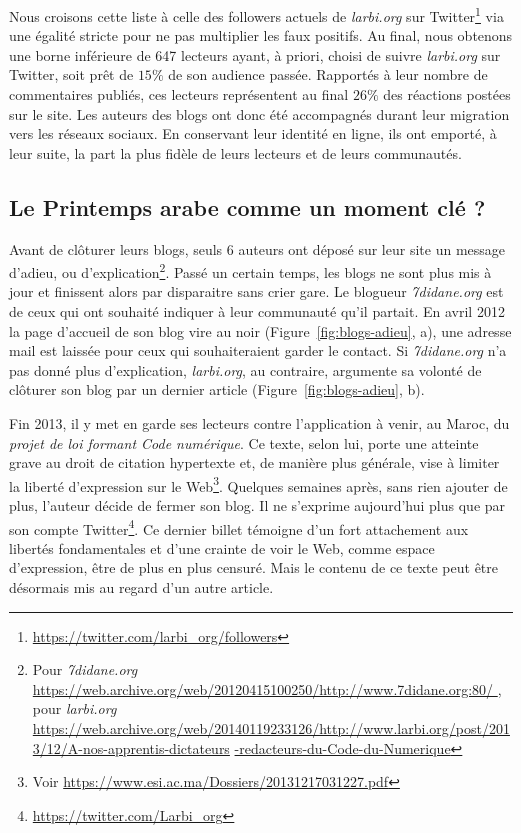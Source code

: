 \documentclass[symmetric,justified,marginals=raggedouter]{tufte-book}
\begin{document}
Nous croisons cette liste à celle des followers actuels de \textit{larbi.org} sur Twitter\footnote{\RaggedOuter \url{https://twitter.com/larbi_org/followers}} via une égalité stricte pour ne pas multiplier les faux positifs. Au final, nous obtenons une borne inférieure de 647 lecteurs ayant, à priori, choisi de suivre \textit{larbi.org} sur Twitter, soit prêt de $15\%$ de son audience passée. Rapportés à leur nombre de commentaires publiés, ces lecteurs représentent au final $26\%$ des réactions postées sur le site. Les auteurs des blogs ont donc été accompagnés durant leur migration vers les réseaux sociaux. En conservant leur identité en ligne, ils ont emporté, à leur suite, la part la plus fidèle de leurs lecteurs et de leurs communautés.

\subsection{Le Printemps arabe comme un moment clé ?}

\noindent Avant de clôturer leurs blogs, seuls 6 auteurs ont déposé sur leur site un message d'adieu, ou d'explication\footnote{\RaggedOuter Pour \textit{7didane.org} \url{https://web.archive.org/web/20120415100250/http://www.7didane.org:80/ 
}, pour \textit{larbi.org} \url{https://web.archive.org/web/20140119233126/http://www.larbi.org/post/2013/12/A-nos-apprentis-dictateurs} \url{-redacteurs-du-Code-du-Numerique}}. Passé un certain temps, les blogs ne sont plus mis à jour et finissent alors par disparaitre sans crier gare. Le blogueur \textit{7didane.org} est de ceux qui ont souhaité indiquer à leur communauté qu'il partait. En avril 2012 la page d'accueil de son blog vire au noir (Figure~\ref{fig:blogs-adieu}, a), une adresse mail est laissée pour ceux qui souhaiteraient garder le contact. Si \textit{7didane.org} n'a pas donné plus d'explication, \textit{larbi.org}, au contraire, argumente sa volonté de clôturer son blog par un dernier article (Figure~\ref{fig:blogs-adieu}, b).

Fin 2013, il y met en garde ses lecteurs contre l'application à venir, au Maroc, du \textit{projet de loi formant Code numérique}. Ce texte, selon lui, porte une atteinte grave au droit de citation hypertexte et, de manière plus générale, vise à limiter la liberté d'expression sur le Web\footnote{\RaggedOuter Voir \url{https://www.esi.ac.ma/Dossiers/20131217031227.pdf}}. Quelques semaines après, sans rien ajouter de plus, l'auteur décide de fermer son blog. Il ne s'exprime aujourd'hui plus que par son compte Twitter\footnote{\RaggedOuter \url{https://twitter.com/Larbi_org}}. Ce dernier billet témoigne d'un fort attachement aux libertés fondamentales et d'une crainte de voir le Web, comme espace d'expression, être de plus en plus censuré. Mais le contenu de ce texte peut être désormais mis au regard d'un autre article. 
\end{document}

